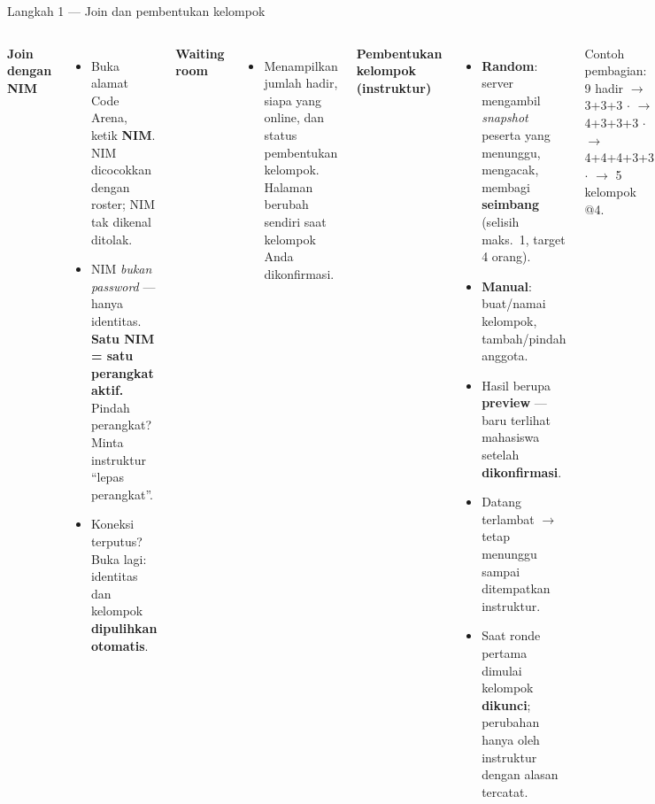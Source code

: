 \documentclass[aspectratio=169,10pt]{beamer}
\newcommand{\hl}[1]{\textcolor{cyanx}{\textbf{#1}}}
\newcommand{\warn}[1]{\textcolor{redx}{\textbf{#1}}}
\begin{document}
\begin{frame}{Langkah 1 --- Join dan pembentukan kelompok}
\begin{columns}[T,onlytextwidth]
\textbf{Join dengan NIM}
\begin{itemize}\setlength\itemsep{0.2em}\small
  \item Buka alamat Code Arena, ketik \hl{NIM}. NIM dicocokkan dengan roster; NIM tak dikenal ditolak.
  \item NIM \emph{bukan password} --- hanya identitas. \warn{Satu NIM = satu perangkat aktif.} Pindah perangkat? Minta instruktur ``lepas perangkat''.
  \item Koneksi terputus? Buka lagi: identitas dan kelompok \textbf{dipulihkan otomatis}.
\end{itemize}
\textbf{Waiting room}
\begin{itemize}\small
  \item Menampilkan jumlah hadir, siapa yang online, dan status pembentukan kelompok. Halaman berubah sendiri saat kelompok Anda dikonfirmasi.
\end{itemize}
\textbf{Pembentukan kelompok (instruktur)}
\begin{itemize}\setlength\itemsep{0.2em}\small
  \item \hl{Random}: server mengambil \emph{snapshot} peserta yang menunggu, mengacak, membagi \textbf{seimbang} (selisih maks.\ 1, target 4 orang).
  \item \hl{Manual}: buat/namai kelompok, tambah/pindah anggota.
  \item Hasil berupa \textbf{preview} --- baru terlihat mahasiswa setelah \textbf{dikonfirmasi}.
  \item Datang terlambat $\rightarrow$ tetap menunggu sampai ditempatkan instruktur.
  \item Saat ronde pertama dimulai kelompok \warn{dikunci}; perubahan hanya oleh instruktur dengan alasan tercatat.
\end{itemize}
\vspace{0.3em}
{\footnotesize\color{greyx}Contoh pembagian: 9 hadir $\rightarrow$ 3+3+3 \;$\cdot$ $\rightarrow$ 4+3+3+3 \;$\cdot$ $\rightarrow$ 4+4+4+3+3 \;$\cdot$ $\rightarrow$ 5 kelompok @4.}
\end{columns}
\end{frame}
\end{document}
